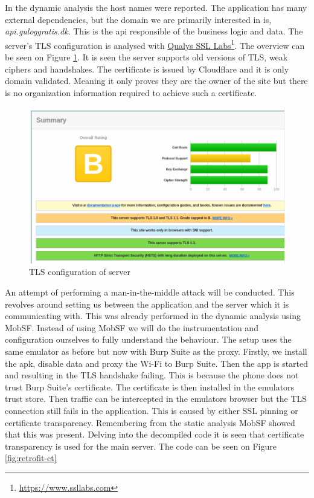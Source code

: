 In the dynamic analysis the host names were reported. The application has many external dependencies, but the domain we are primarily interested in is, \textit{api.guloggratis.dk}. This is the api responsible of the business logic and data. The server's TLS configuration is analysed with \href{https://www.ssllabs.com}{Qualys SSL Labs}\footnote{\href{https://www.ssllabs.com}{https://www.ssllabs.com}}. The overview can be seen on Figure \ref{fig:sslreport-overview}. It is seen the server supports old versions of TLS, weak ciphers and handshakes. The certificate is issued by Cloudflare and it is only domain validated. Meaning it only proves they are the owner of the site but there is no organization information required to achieve such a certificate.  

\begin{figure}[htbp]
    \centering
    \includegraphics[width=1\columnwidth]{../static-analysis/pictures/sslreport_overview.png}
    \caption{TLS configuration of server}
    \label{fig:sslreport-overview}
\end{figure}

An attempt of performing a man-in-the-middle attack will be conducted. This revolves around setting us between the application and the server which it is communicating with. This was already performed in the dynamic analysis using MobSF. Instead of using MobSF we will do the instrumentation and configuration ourselves to fully understand the behaviour. The setup uses the same emulator as before but now with Burp Suite as the proxy. Firstly, we install the apk, disable data and proxy the Wi-Fi to Burp Suite. Then the app is started and resulting in the TLS handshake failing. This is because the phone does not trust Burp Suite's certificate. The certificate is then installed in the emulators trust store. Then traffic can be intercepted in the emulators browser but the TLS connection still fails in the application. This is caused by either SSL pinning or certificate transparency. Remembering from the static analysis MobSF showed that this was present. Delving into the decompiled code it is seen that certificate transparency is used for the main server. The code can be seen on Figure \ref{fig:retrofit-ct}

